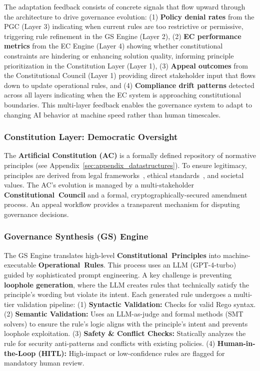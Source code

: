 The adaptation feedback consists of concrete signals that flow upward through the architecture to drive governance evolution: (1) \textbf{Policy denial rates} from the PGC (Layer 3) indicating when current rules are too restrictive or permissive, triggering rule refinement in the GS Engine (Layer 2), (2) \textbf{EC performance metrics} from the EC Engine (Layer 4) showing whether constitutional constraints are hindering or enhancing solution quality, informing principle prioritization in the Constitution Layer (Layer 1), (3) \textbf{Appeal outcomes} from the Constitutional Council (Layer 1) providing direct stakeholder input that flows down to update operational rules, and (4) \textbf{Compliance drift patterns} detected across all layers indicating when the EC system is approaching constitutional boundaries. This multi-layer feedback enables the governance system to adapt to changing AI behavior at machine speed rather than human timescales.

\subsubsection{Constitution Layer: Democratic Oversight}
The \textbf{Artificial Constitution (AC)} is a formally defined repository of normative principles (see Appendix~\ref{sec:appendix_datastructures}). To ensure legitimacy, principles are derived from legal frameworks~\cite{gdpr2016}, ethical standards~\cite{barocas2019fairness}, and societal values. The AC's evolution is managed by a multi-stakeholder \textbf{Constitutional\allowbreak\ Council} and a formal, cryptographically-secured amendment process. An appeal workflow provides a transparent mechanism for disputing governance decisions.

\subsubsection{Governance Synthesis (GS) Engine}
{\sloppy
The GS Engine translates high-level \textbf{Constitutional\allowbreak\ Principles} into machine-executable \textbf{Operational\allowbreak\ Rules}. This process uses an LLM (GPT-4-turbo) guided by sophisticated prompt engineering. A key challenge is preventing \textbf{loophole generation}, where the LLM creates rules that technically satisfy the principle's wording but violate its intent. Each generated rule undergoes a multi-tier validation pipeline:
(1) \textbf{Syntactic Validation:} Checks for valid Rego syntax.
(2) \textbf{Semantic Validation:} Uses an LLM-as-judge and formal methods (SMT solvers) to ensure the rule's logic aligns with the principle's intent and prevents loophole exploitation.
(3) \textbf{Safety \& Conflict Checks:} Statically analyzes the rule for security anti-patterns and conflicts with existing policies.
(4) \textbf{Human-in-the-Loop (HITL):} High-impact or low-confidence rules are flagged for mandatory human review.
}

